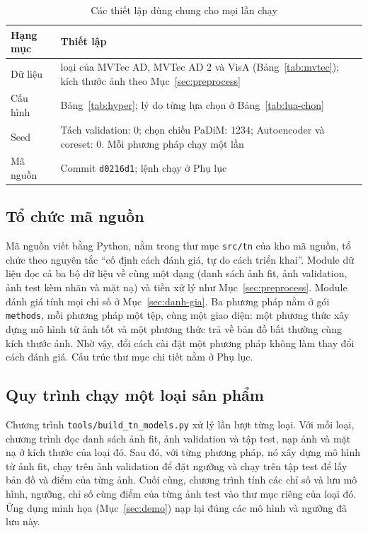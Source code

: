 \begin{table}[htbp]
  \centering
  \caption{Các thiết lập dùng chung cho mọi lần chạy}
  \label{tab:thiet-lap-chung}
  \small
  \begin{tabular}{@{}>{\raggedright\arraybackslash}p{2.8cm} >{\raggedright\arraybackslash}p{11.7cm}@{}}
    \toprule
    Hạng mục & Thiết lập \\
    \midrule
    Dữ liệu & 9 loại của MVTec AD, MVTec AD 2 và VisA (Bảng~\ref{tab:mvtec}); kích thước ảnh theo
      Mục~\ref{sec:preprocess} \\
    Cấu hình & Bảng~\ref{tab:hyper}; lý do từng lựa chọn ở Bảng~\ref{tab:lua-chon} \\
    Seed & Tách validation: 0; chọn chiều PaDiM: 1234; Autoencoder và coreset: 0. Mỗi phương pháp chạy một lần \\
    Mã nguồn & Commit \texttt{d0216d1}; lệnh chạy ở Phụ lục \\
    \bottomrule
  \end{tabular}
\end{table}

\subsection{Tổ chức mã nguồn}

Mã nguồn viết bằng Python, nằm trong thư mục \texttt{src/tn} của kho mã nguồn, tổ chức theo nguyên tắc ``cố định cách
đánh giá, tự do cách triển khai''. Module dữ liệu đọc cả ba bộ dữ liệu về cùng một dạng (danh sách ảnh fit, ảnh
validation, ảnh test kèm nhãn và mặt nạ) và tiền xử lý như Mục~\ref{sec:preprocess}. Module đánh giá tính mọi chỉ số
ở Mục~\ref{sec:danh-gia}. Ba phương pháp nằm ở gói \texttt{methods}, mỗi phương pháp một tệp, cùng một giao diện: một
phương thức xây dựng mô hình từ ảnh tốt và một phương thức trả về bản đồ bất thường cùng kích thước ảnh. Nhờ vậy,
đổi cách cài đặt một phương pháp không làm thay đổi cách đánh giá.
Cấu trúc thư mục chi tiết nằm ở Phụ lục.

\subsection{Quy trình chạy một loại sản phẩm}

Chương trình \texttt{tools/build\_tn\_models.py} xử lý lần lượt từng loại. Với mỗi loại, chương trình đọc danh sách
ảnh fit, ảnh validation và tập test, nạp ảnh và mặt nạ ở kích thước của loại đó. Sau đó, với từng phương pháp, nó
xây dựng mô hình từ ảnh fit, chạy trên ảnh validation để đặt ngưỡng và chạy trên tập test để lấy bản đồ và điểm của
từng ảnh. Cuối cùng, chương trình tính các chỉ số và lưu mô hình, ngưỡng, chỉ số cùng điểm của từng ảnh test vào thư
mục riêng của loại đó. Ứng dụng minh họa (Mục~\ref{sec:demo}) nạp lại đúng các mô hình và ngưỡng đã lưu này.

